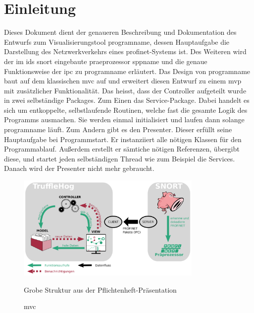 \chapter{Einleitung}
Dieses Dokument dient der genaueren Beschreibung und Dokumentation des Entwurfs zum Visualisierungstool \gls{programname}, dessen Hauptaufgabe die Darstellung des Netzwerkverkehrs eines \gls{profinet}-Systems ist. Des Weiteren wird der im \gls{ids} \gls{snort} eingebaute \gls{praeprozessor} \gls{sppname} und die genaue Funktionsweise der \gls{ipc} zu \gls{programname} erläutert.\newline
\newline
Das Design von \gls{programname} baut auf dem klassischen \gls{mvc} auf und erweitert diesen Entwurf zu einem \gls{mvp} mit zusätzlicher Funktionalität. Das heisst, dass der Controller aufgeteilt wurde in zwei selbständige Packages. Zum Einen das Service-Package. Dabei handelt es sich um entkoppelte, selbstlaufende Routinen, welche fast die gesamte Logik des Programms ausmachen. Sie werden einmal initialisiert und laufen dann solange \gls{programname} läuft. Zum Andern gibt es den Presenter. Dieser erfüllt seine Hauptaufgabe bei Programmstart. Er instanziiert alle nötigen Klassen für den Programmablauf. Außerdem erstellt er sämtiche nötigen Referenzen, übergibt diese, und startet jeden selbständigen Thread wie zum Beispiel die Services. Danach wird der Presenter nicht mehr gebraucht.

\begin{figure}[H]
  \centering
  \includegraphics[width=0.8\textwidth]{../diagramimages/praesentationsmodel.png}
  \caption[\gls{mvc}]{\gls{mvc}}
  \medskip
  Grobe Struktur aus der Pflichtenheft-Präsentation
\end{figure} 